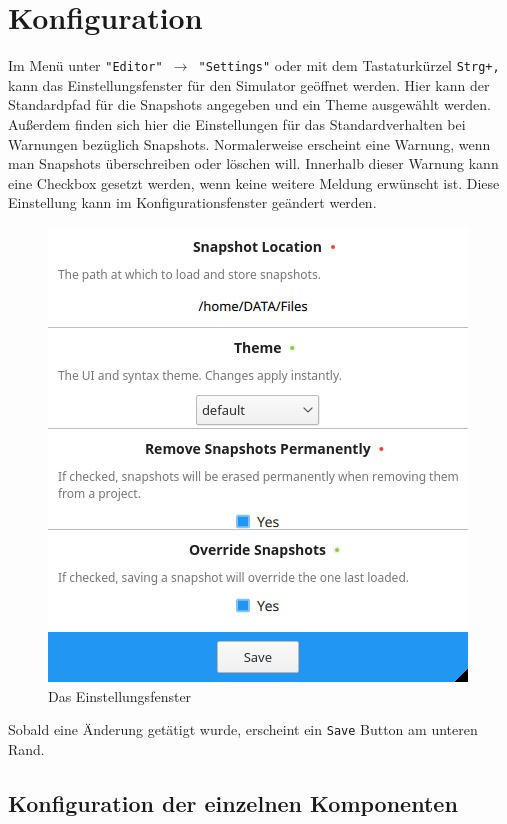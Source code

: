 
\section{Konfiguration}
\label{user-manual-configuration}

Im Menü unter \texttt{"Editor" $\rightarrow$ "Settings"} oder mit dem Tastaturkürzel
\texttt{Strg+,} kann das Einstellungsfenster für den Simulator geöffnet werden.
Hier kann der Standardpfad für die Snapshots angegeben und ein Theme
ausgewählt werden.\\
Außerdem finden sich hier die Einstellungen für das
Standardverhalten bei Warnungen bezüglich Snapshots. Normalerweise erscheint
eine Warnung, wenn man Snapshots überschreiben oder löschen will.  Innerhalb
dieser Warnung kann eine Checkbox gesetzt werden, wenn keine weitere Meldung erwünscht
ist. Diese Einstellung kann im Konfigurationsfenster geändert werden.


\begin{figure}[ht]
	\centering
  \includegraphics[scale=0.9]{Images/Settings}
	\caption{Das Einstellungsfenster}
	\label{Settings}
\end{figure}


Sobald eine Änderung getätigt wurde, erscheint ein \texttt{Save} Button am unteren Rand.


\subsection{Konfiguration der einzelnen Komponenten}

